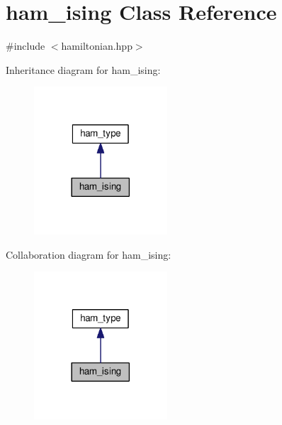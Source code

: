 \hypertarget{classham__ising}{}\section{ham\+\_\+ising Class Reference}
\label{classham__ising}


{\ttfamily \#include $<$hamiltonian.\+hpp$>$}



Inheritance diagram for ham\+\_\+ising\+:\nopagebreak
\begin{figure}[H]
\begin{center}
\leavevmode
\includegraphics[width=141pt]{d1/de5/classham__ising__inherit__graph}
\end{center}
\end{figure}


Collaboration diagram for ham\+\_\+ising\+:\nopagebreak
\begin{figure}[H]
\begin{center}
\leavevmode
\includegraphics[width=141pt]{d7/d27/classham__ising__coll__graph}
\end{center}
\end{figure}
